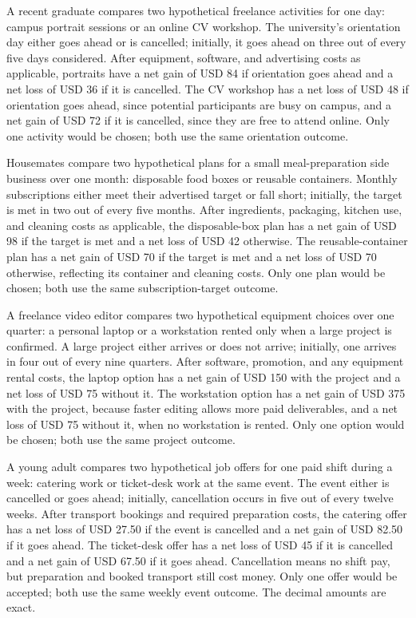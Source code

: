 \vspace{-3mm}
A recent graduate compares two hypothetical freelance activities for one day: campus
portrait sessions or an online CV workshop. The university's orientation day either goes
ahead or is cancelled; initially, it goes ahead on three out of every five days considered.
After equipment, software, and advertising costs as applicable, portraits have a net gain
of USD 84 if orientation goes ahead and a net loss of USD 36 if it is cancelled. The CV
workshop has a net loss of USD 48 if orientation goes ahead, since potential participants
are busy on campus, and a net gain of USD 72 if it is cancelled, since they are free to
attend online. Only one activity would be chosen; both use the same orientation outcome.

Housemates compare two hypothetical plans for a small meal-preparation side business over
one month: disposable food boxes or reusable containers. Monthly subscriptions either
meet their advertised target or fall short; initially, the target is met in two out of
every five months. After ingredients, packaging, kitchen use, and cleaning costs as
applicable, the disposable-box plan has a net gain of USD 98 if the target is met and a
net loss of USD 42 otherwise. The reusable-container plan has a net gain of USD 70 if the
target is met and a net loss of USD 70 otherwise, reflecting its container and cleaning
costs. Only one plan would be chosen; both use the same subscription-target outcome.

A freelance video editor compares two hypothetical equipment choices over one quarter:
a personal laptop or a workstation rented only when a large project is confirmed.
A large project either arrives or does not arrive; initially, one arrives in four out
of every nine quarters. After software, promotion, and any equipment rental costs, the
laptop option has a net gain of USD 150 with the project and a net loss of USD 75 without
it. The workstation option has a net gain of USD 375 with the project, because faster
editing allows more paid deliverables, and a net loss of USD 75 without it, when no
workstation is rented. Only one option would be chosen; both use the same project outcome.

A young adult compares two hypothetical job offers for one paid shift during a week:
catering work or ticket-desk work at the same event. The event either is cancelled or
goes ahead; initially, cancellation occurs in five out of every twelve weeks. After
transport bookings and required preparation costs, the catering offer has a net loss of
USD 27.50 if the event is cancelled and a net gain of USD 82.50 if it goes ahead. The
ticket-desk offer has a net loss of USD 45 if it is cancelled and a net gain of USD 67.50
if it goes ahead. Cancellation means no shift pay, but preparation and booked transport
still cost money. Only one offer would be accepted; both use the same weekly event outcome.
The decimal amounts are exact.


